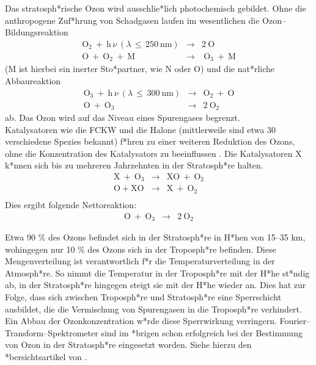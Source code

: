 Das stratosph*rische Ozon wird ausschlie*lich photochemisch
gebildet. Ohne die anthropogene Zuf*hrung von Schadgasen laufen im
wesentlichen die Ozon--\-Bild\-ungs\-re\-aktion
\begin{eqnarray}\label{eqozon1}
  \text{O}_2 \: + \: \text{h} \, \nu \: (\lambda \,\leq \, 250 \: \text{nm})  & \rightarrow & 2 \:
  \text{O}
  \nonumber\\
  \text{O} \: + \: \text{O}_2 \: + \: \text{M}  & \rightarrow & \: \text{O}_3 \: + \:
  \text{M}
\end{eqnarray}
(M ist hierbei ein inerter Sto*partner, wie N oder
O) und die nat*rliche Abbaureaktion
\begin{eqnarray}\label{eqozon2}
  \text{O}_3 \: + \: \text{h} \, \nu \: (\lambda \, \leq \, 300 \: \text{nm}) & \rightarrow & \text{O}_2 \: + \:
  \text{O}\nonumber\\
  \text{O} \: + \: \text{O}_3 & \rightarrow & 2 \: \text{O}_2
\end{eqnarray}
ab. Das Ozon wird auf das Niveau eines Spurengases begrenzt.\\

Katalysatoren wie die FCKW und die Halone (mittlerweile sind etwa
30 verschiedene Spezies bekannt) f*hren zu einer weiteren
Reduktion des Ozons, ohne die Konzentration des Katalysators zu
beeinflussen \cite{zellner93}. Die Katalysatoren X k*nnen sich bis
zu mehreren Jahrzehnten in der Stratosph*re halten.
\begin{eqnarray}\label{eqozon3}
 \text{X} \: + \: \text{O}_3 & \rightarrow & \text{XO} \: + \:
 \text{O}_2\nonumber\\
 \text{O} \: + \: \text{XO} & \rightarrow & \text{X} \: + \:
 \text{O}_2\\
\end{eqnarray}
Dies ergibt folgende Nettoreaktion:
\begin{eqnarray}\label{eqozon4}
  \text{O} \: + \: \text{O}_3 & \rightarrow & 2 \: \text{O}_2
\end{eqnarray}

Etwa 90 \% des Ozons befindet sich in der Stratosph*re in H*hen
von 15--35 km, wohingegen nur 10 \% des Ozons sich in der
Troposph*re befinden. Diese Mengenverteilung ist verantwortlich
f*r die Temperaturverteilung in der Atmosph*re. So nimmt die
Temperatur in der Troposph*re mit der H*he st*ndig ab, in der
Stratosph*re hingegen steigt sie mit der H*he wieder an. Dies hat
zur Folge, dass sich zwischen Troposph*re und Stratosph*re eine
Sperrschicht ausbildet, die die Vermischung von Spurengasen in die
Troposph*re verhindert. Ein Abbau der Ozonkonzentration w*rde
diese Sperrwirkung verringern. Fourier--Transform--Spektrometer
sind im *brigen schon erfolgreich bei der Bestimmung von Ozon in
der Stratosph*re eingesetzt worden. Siehe hierzu den
*bersichtsartikel von \cite{traub98}.\\

